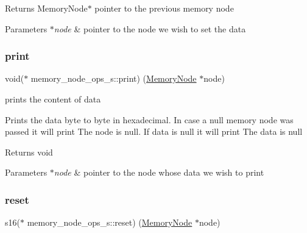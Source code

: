 \begin{DoxyReturn}{Returns}
Memory\+Node$\ast$ pointer to the previous memory node 
\end{DoxyReturn}

\begin{DoxyParams}{Parameters}
{\em $\ast$node} & pointer to the node we wish to set the data \\
\hline
\end{DoxyParams}
\mbox{\label{structmemory__node__ops__s_ad5a051d70388c508b600399b0cca0973}} 
\subsubsection{\texorpdfstring{print}{print}}
{\footnotesize\ttfamily void($\ast$ memory\+\_\+node\+\_\+ops\+\_\+s\+::print) (\hyperlink{structmemory__node__s}{Memory\+Node} $\ast$node)}



prints the content of data 

Prints the data byte to byte in hexadecimal. In case a null memory node was passed it will print The node is null. If data is null it will print The data is null \begin{DoxyReturn}{Returns}
void 
\end{DoxyReturn}

\begin{DoxyParams}{Parameters}
{\em $\ast$node} & pointer to the node whose data we wish to print \\
\hline
\end{DoxyParams}
\mbox{\label{structmemory__node__ops__s_a8a9d4846b4b5628d9994467f6f492b81}} 
\subsubsection{\texorpdfstring{reset}{reset}}
{\footnotesize\ttfamily s16($\ast$ memory\+\_\+node\+\_\+ops\+\_\+s\+::reset) (\hyperlink{structmemory__node__s}{Memory\+Node} $\ast$node)}



